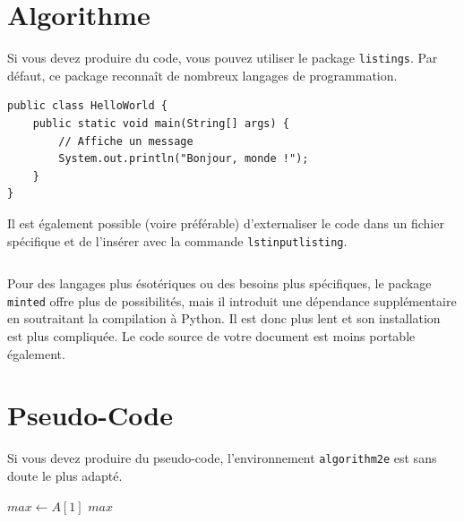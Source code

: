 \documentclass[a4paper,11pt]{book}
\begin{document}
 \section{Algorithme}


 Si vous devez produire du code, vous pouvez utiliser le package
 \texttt{listings}. Par défaut, ce package reconnaît de nombreux
 langages de programmation.

\begin{lstlisting}[caption=Classe HelloWorld en Java]
public class HelloWorld {
    public static void main(String[] args) {
        // Affiche un message
        System.out.println("Bonjour, monde !");
    }
}
\end{lstlisting}

Il est également possible (voire préférable) d'externaliser le code
dans un fichier spécifique et de l'insérer avec la commande
\texttt{lstinputlisting}.

\begin{verbatim}

\end{verbatim}

Pour des langages plus ésotériques ou des besoins plus spécifiques, le
package \texttt{minted} offre plus de possibilités, mais il introduit
une dépendance supplémentaire en soutraitant la compilation à
Python. Il est donc plus lent et son installation est plus
compliquée. Le code source de votre document est moins portable
également.
 
 \section{Pseudo-Code}

 Si vous devez produire du pseudo-code, l'environnement
 \texttt{algorithm2e} est sans doute le plus adapté.

 \begin{algorithm}[H]
\DontPrintSemicolon
{}
$max \leftarrow A[1]$\;
\Return $max$\;
\caption{Recherche du maximum dans un tableau}
\end{algorithm}



% 


\end{document}
